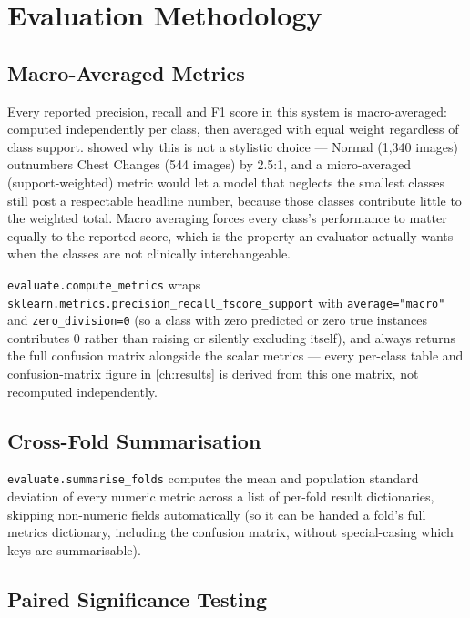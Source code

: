 \documentclass[11pt,a4paper,oneside]{report}
\newcommand{\code}[1]{\texttt{\small #1}}
\begin{document}
\chapter{Evaluation Methodology}
\label{ch:evaluation}

\section{Macro-Averaged Metrics}

Every reported precision, recall and F1 score in this system is macro-averaged:
computed independently per class, then averaged with equal weight regardless
of class support.  showed why this is not a stylistic
choice --- Normal (1{,}340 images) outnumbers Chest Changes (544 images) by
2.5:1, and a micro-averaged (support-weighted) metric would let a model that
neglects the smallest classes still post a respectable headline number,
because those classes contribute little to the weighted total. Macro
averaging forces every class's performance to matter equally to the reported
score, which is the property an evaluator actually wants when the classes
are not clinically interchangeable.

\code{evaluate.compute\_metrics} wraps
\code{sklearn.metrics.precision\_recall\_fscore\_support} with
\code{average="macro"} and \code{zero\_division=0} (so a class with zero
predicted or zero true instances contributes 0 rather than raising or
silently excluding itself), and always returns the full confusion matrix
alongside the scalar metrics --- every per-class table and confusion-matrix
figure in \cref{ch:results} is derived from this one matrix, not
recomputed independently.

\section{Cross-Fold Summarisation}

\code{evaluate.summarise\_folds} computes the mean and population standard
deviation of every numeric metric across a list of per-fold result
dictionaries, skipping non-numeric fields automatically (so it can be handed
a fold's full metrics dictionary, including the confusion matrix, without
special-casing which keys are summarisable).

\section{Paired Significance Testing}
\end{document}
